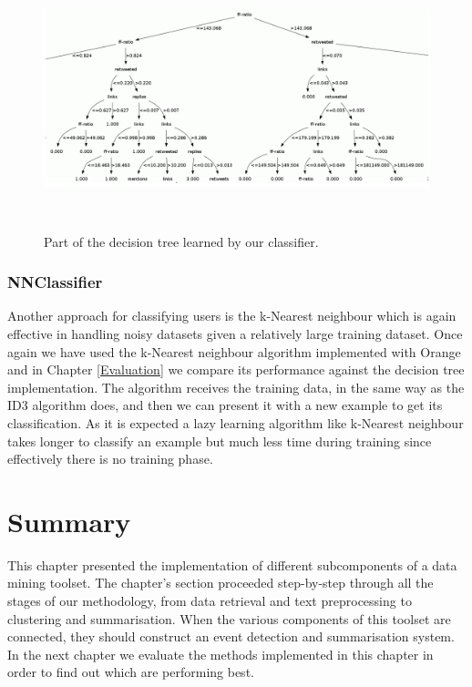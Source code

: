 \begin{figure}[htbp]
  \begin{center}
    \includegraphics[height=3in, width=6in]{tree}
    \caption{Part of the decision tree learned by our classifier.}
    \label{Tree}
  \end{center}
\end{figure} 

\subsubsection{NNClassifier}
Another approach for classifying users is the k-Nearest neighbour which is again effective in handling noisy datasets given a relatively large training dataset. Once again we have used the k-Nearest neighbour algorithm implemented with Orange and in Chapter \ref{Evaluation} we compare its performance against the decision tree implementation. The algorithm receives the training data, in the same way as the ID3 algorithm does, and then we can present it with a new example to get its classification. As it is expected a lazy learning algorithm like k-Nearest neighbour takes longer to classify an example but much less time during training since effectively there is no training phase.   

\section{Summary}
This chapter presented the implementation of different subcomponents of a data mining toolset. The chapter's section proceeded step-by-step through all the stages of our methodology, from data retrieval and text preprocessing to clustering and summarisation. When the various components of this toolset are connected, they should construct an event detection and summarisation system. In the next chapter we evaluate the methods implemented in this chapter in order to find out which are performing best.


